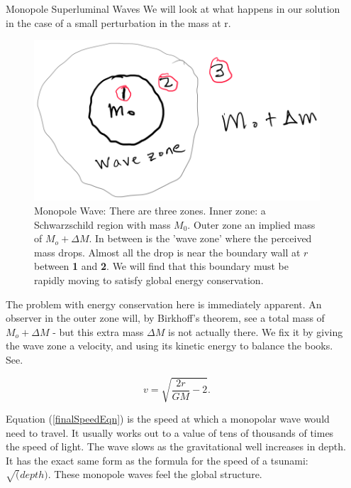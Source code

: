 \documentclass[final]{beamer}
\newlength{\sepwidth}
\newlength{\colwidth}
\newcommand{\separatorcolumn}{\begin{column}{\sepwidth}\end{column}}
\begin{document}
\begin{frame}[t]
\begin{columns}[t]
\begin{column}{\colwidth}
\begin{block}{Monopole Superluminal Waves}
	We will look at what happens in our solution in the case of a small perturbation in the mass at r. 
\begin{figure}
\includegraphics[width=0.6\columnwidth]{monopole.png}
\caption{Monopole Wave: There are three zones. Inner zone: a Schwarzschild region with mass $M_0$. Outer zone an implied mass of $M_o + \Delta M$. In between is the 'wave zone' where the perceived mass drops. Almost all the drop is near the boundary wall at $r$ between \textbf{1} and \textbf{2}. We will find that this boundary must be rapidly moving to satisfy global energy conservation.}
\label{monopoleEnergy} 
\end{figure}

The problem with energy conservation here is immediately apparent. An observer in the outer zone will, by Birkhoff's theorem, see a total mass of $M_o + \Delta M$ - but this extra mass $\Delta M$ is not actually there. We fix it by giving the wave zone a velocity, and using its kinetic energy to balance the books. See\cite{andersenEinsteinsMissingEnergy2025}.

\begin{equation} \label{finalSpeedEqn}
 v = \sqrt{\frac{2 r}{GM} - 2}.
\end{equation}

Equation (\ref{finalSpeedEqn}) is the speed at which a monopolar wave would need to travel. It usually works out to a value of tens of thousands of times the speed of light. The wave slows as the gravitational well increases in depth. It has the exact same form as the formula for the speed of a tsunami: $\sqrt(depth)$. These monopole waves feel the global structure.
\end{block}


\end{column}
\separatorcolumn



\end{columns}
\end{frame}
\end{document}
